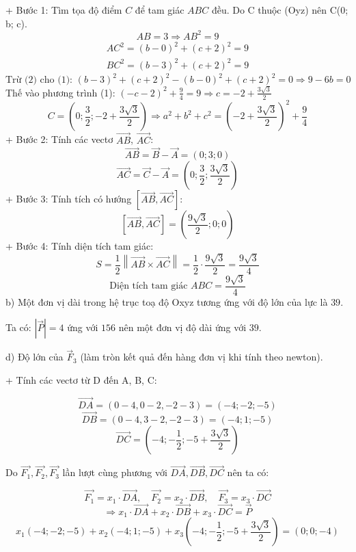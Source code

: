 \documentclass[a4paper,12pt]{article}
\begin{document}
+ Bước 1: Tìm tọa độ điểm \(C\) để tam giác \(ABC\) đều.
Do C thuộc (Oyz) nên C(0; b; c).
\[ AB = 3 \Rightarrow AB^2 = 9 \]
\begin{align}
AC^2 = (b - 0)^2 + (c +2)^2 = 9 \tag{1} \\
BC^2 = (b - 3)^2 + (c +2)^2 = 9 \tag{2}
\end{align}
\[\text{Trừ (2) cho (1): }(b - 3)^2 + (c + 2)^2 - (b - 0)^2 + (c + 2)^2 = 0 \Rightarrow 9 - 6 b = 0\]
Thế vào phương trình (1): \(\left(- c - 2\right)^{2} + \frac{9}{4} = 9 \Rightarrow c=-2 + \frac{3 \sqrt{3}}{2}\)
\[C = (0; \frac{3}{2}; -2 + \frac{3 \sqrt{3}}{2}) \Rightarrow a^2+b^2+c^2=\left(-2 + \frac{3 \sqrt{3}}{2}\right)^{2} + \frac{9}{4}\]
+ Bước 2: Tính các vectơ \(\overrightarrow{AB}\), \(\overrightarrow{AC}\):
\[ \overrightarrow{AB} = \overrightarrow{B} - \overrightarrow{A} = (0; 3; 0) \]
\[ \overrightarrow{AC} = \overrightarrow{C} - \overrightarrow{A} = (0; \frac{3}{2}; \frac{3 \sqrt{3}}{2}) \]
+ Bước 3: Tính tích có hướng \(\left[\overrightarrow{AB}, \overrightarrow{AC}\right]\):
\[ [\overrightarrow{AB},  \overrightarrow{AC}] = (\frac{9 \sqrt{3}}{2}; 0; 0) \]
+ Bước 4: Tính diện tích tam giác:
\[
S = \frac{1}{2} \left\| \overrightarrow{AB} \times \overrightarrow{AC} \right\| = \frac{1}{2} \cdot \frac{9 \sqrt{3}}{2}
= \frac{9 \sqrt{3}}{4}
\]
\[\text{Diện tích tam giác } ABC = \frac{9 \sqrt{3}}{4}\]
b) Một đơn vị dài trong hệ trục toạ độ Oxyz tương ứng với độ lớn của lực là \(39\).


Ta có: \(|\overrightarrow{P}| = 4\) ứng với \(156\) nên một đơn vị độ dài ứng với \(39\).




d) Độ lớn của \(\overrightarrow{F}_3\) (làm tròn kết quả đến hàng đơn vị khi tính theo newton).


+ Tính các vectơ từ D đến A, B, C:


\[ \overrightarrow{DA} = (0 - 4, 0 - 2, -2 - 3) = (-4; -2; -5) \]
\[ \overrightarrow{DB} = (0 - 4, 3 - 2, -2 - 3) = (-4; 1; -5) \]
\[ \overrightarrow{DC} = (-4; - \frac{1}{2}; -5 + \frac{3 \sqrt{3}}{2}) \]


Do \(\overrightarrow{F_1},\overrightarrow{F_2}, \overrightarrow{F_3}\) lần lượt cùng phương với \(\overrightarrow{DA}, \overrightarrow{DB}, \overrightarrow{DC}\) nên ta có:


\[ \overrightarrow{F_1} = x_1 \cdot \overrightarrow{DA},\quad \overrightarrow{F_2} = x_2 \cdot \overrightarrow{DB},\quad \overrightarrow{F_3} = x_3 \cdot \overrightarrow{DC} \]
\[ \Rightarrow x_1 \cdot \overrightarrow{DA} + x_2 \cdot \overrightarrow{DB} + x_3 \cdot \overrightarrow{DC} = \overrightarrow{P} \]
\[ x_1(-4; -2; -5) + x_2(-4; 1; -5) + x_3(-4; - \frac{1}{2}; -5 + \frac{3 \sqrt{3}}{2}) = (0; 0; -4) \]
\end{document}
